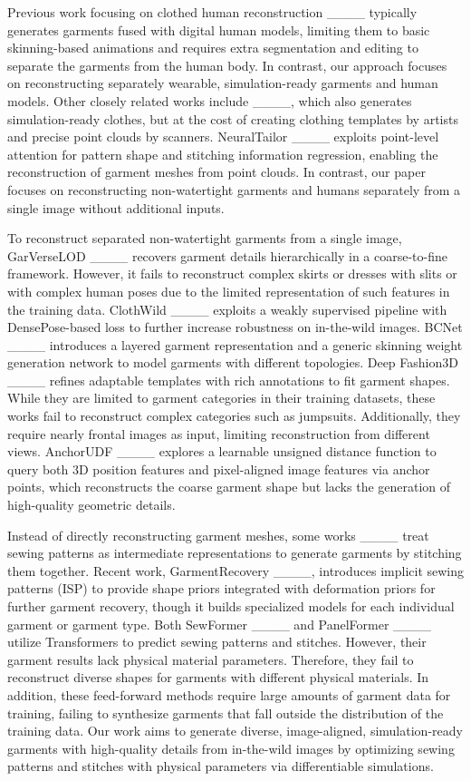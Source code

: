 Previous work focusing on clothed human reconstruction ____ typically generates garments fused with digital human models, limiting them to basic skinning-based animations and requires extra segmentation and editing to separate the garments from the human body. In contrast, our approach focuses on reconstructing separately wearable, simulation-ready garments and human models. Other closely related works include ____, which also generates simulation-ready clothes, but at the cost of creating clothing templates by artists and precise point clouds by scanners. NeuralTailor ____ exploits point-level attention for pattern shape and stitching information regression, enabling the reconstruction of garment meshes from point clouds. In contrast, our paper focuses on reconstructing non-watertight garments and humans separately from a single image without additional inputs. 

To reconstruct separated non-watertight garments from a single image, GarVerseLOD ____ recovers garment details hierarchically in a coarse-to-fine framework. However, it fails to reconstruct complex skirts or dresses with slits or with complex human poses due to the limited representation of such features in the training data. ClothWild ____ exploits a weakly supervised pipeline with DensePose-based loss to further increase robustness on in-the-wild images. BCNet ____ introduces a layered garment representation and a generic skinning weight generation network to model garments with different topologies. Deep Fashion3D ____ refines adaptable templates with rich annotations to fit garment shapes. While they are limited to garment categories in their training datasets, these works fail to reconstruct complex categories such as jumpsuits. Additionally, they require nearly frontal images as input, limiting reconstruction from different views. AnchorUDF ____ explores a learnable unsigned distance function to query both 3D position features and pixel-aligned image features via anchor points, which reconstructs the coarse garment shape but lacks the generation of high-quality geometric details.

Instead of directly reconstructing garment meshes, some works ____ treat sewing patterns as intermediate representations to generate garments by stitching them together. Recent work, GarmentRecovery ____, introduces implicit sewing patterns (ISP) to provide shape priors integrated with deformation priors for further garment recovery, though it builds specialized models for each individual garment or garment type. Both SewFormer ____ and PanelFormer ____ utilize Transformers to predict sewing patterns and stitches. However, their garment results lack physical material parameters. Therefore, they fail to reconstruct diverse shapes for garments with different physical materials. In addition, these feed-forward methods require large amounts of garment data for training, failing to synthesize garments that fall outside the distribution of the training data. Our work aims to generate diverse, image-aligned, simulation-ready garments with high-quality details from in-the-wild images by optimizing sewing patterns and stitches with physical parameters via differentiable simulations.


